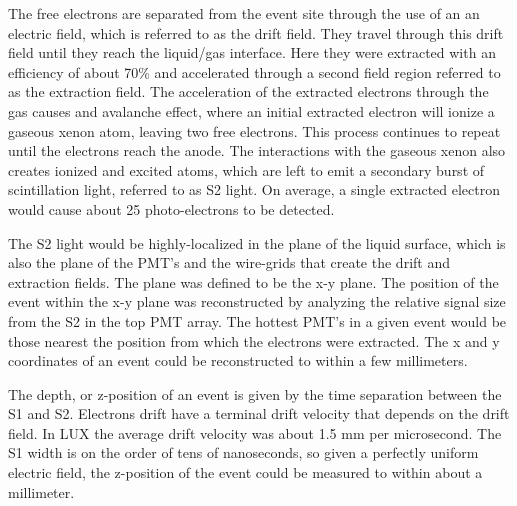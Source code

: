 The free electrons are separated from the event site through the use of an an electric field, which is referred to as the drift field. They travel through this drift field until they reach the liquid/gas interface. Here they were extracted with an efficiency of about 70\% and accelerated through a second field region referred to as the extraction field. The acceleration of the extracted electrons through the gas causes and avalanche effect, where an initial extracted electron will ionize a gaseous xenon atom, leaving two free electrons. This process continues to repeat until the electrons reach the anode. The interactions with the gaseous xenon also creates ionized and excited atoms, which are left to emit a secondary burst of scintillation light, referred to as S2 light. On average, a single extracted electron would cause about 25 photo-electrons to be detected.

The S2 light would be highly-localized in the plane of the liquid surface, which is also the plane of the PMT's and the wire-grids that create the drift and extraction fields. The plane was defined to be the x-y plane. The position of the event within the x-y plane was reconstructed by analyzing the relative signal size from the S2 in the top PMT array. The hottest PMT's in a given event would be those nearest the position from which the electrons were extracted. The x and y coordinates of an event could be reconstructed to within a few millimeters.

The depth, or z-position of an event is given by the time separation between the S1 and S2. Electrons drift have a terminal drift velocity that depends on the drift field. In LUX the average drift velocity was about 1.5 mm per microsecond. The S1 width is on the order of tens of nanoseconds, so given a perfectly uniform electric field, the z-position of the event could be measured to within about a millimeter.


